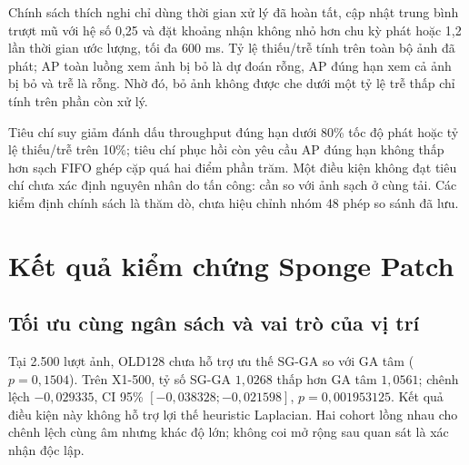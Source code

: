 \documentclass[a4paper,fleqn]{cas-dc}
\begin{document}
Chính sách thích nghi chỉ dùng thời gian xử lý đã hoàn tất, cập nhật trung bình trượt mũ với hệ số 0,25 và đặt khoảng nhận không nhỏ hơn chu kỳ phát hoặc 1,2 lần thời gian ước lượng, tối đa 600 ms. Tỷ lệ thiếu/trễ tính trên toàn bộ ảnh đã phát; AP toàn luồng xem ảnh bị bỏ là dự đoán rỗng, AP đúng hạn xem cả ảnh bị bỏ và trễ là rỗng. Nhờ đó, bỏ ảnh không được che dưới một tỷ lệ trễ thấp chỉ tính trên phần còn xử lý.

Tiêu chí suy giảm đánh dấu throughput đúng hạn dưới 80\% tốc độ phát hoặc tỷ lệ thiếu/trễ trên 10\%; tiêu chí phục hồi còn yêu cầu AP đúng hạn không thấp hơn sạch FIFO ghép cặp quá hai điểm phần trăm. Một điều kiện không đạt tiêu chí chưa xác định nguyên nhân do tấn công: cần so với ảnh sạch ở cùng tải. Các kiểm định chính sách là thăm dò, chưa hiệu chỉnh nhóm 48 phép so sánh đã lưu.

\section{Kết quả kiểm chứng Sponge Patch}

\subsection{Tối ưu cùng ngân sách và vai trò của vị trí}

Tại 2.500 lượt ảnh, OLD128 chưa hỗ trợ ưu thế SG-GA so với GA tâm ($p=0{,}1504$). Trên X1-500, tỷ số SG-GA $1{,}0268$ thấp hơn GA tâm $1{,}0561$; chênh lệch $-0{,}029335$, CI 95\% $[-0{,}038328;-0{,}021598]$, $p=0{,}001953125$. Kết quả điều kiện này không hỗ trợ lợi thế heuristic Laplacian. Hai cohort lồng nhau cho chênh lệch cùng âm nhưng khác độ lớn; không coi mở rộng sau quan sát là xác nhận độc lập.
\end{document}
